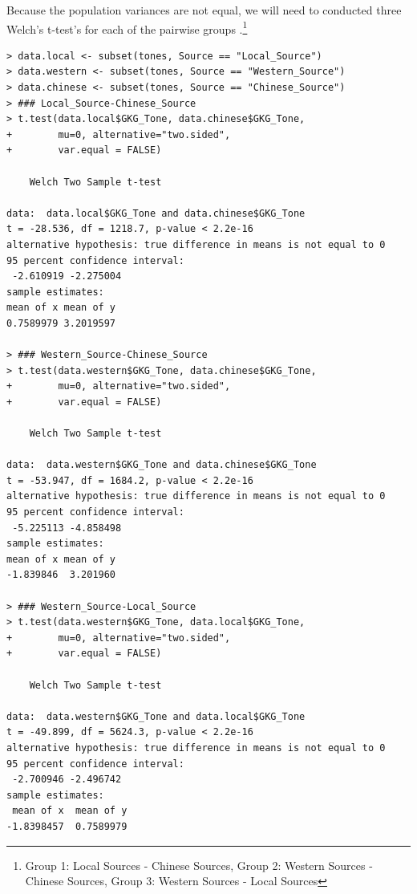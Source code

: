 \documentclass[12pt]{article}
\begin{document}
Because the population variances are not equal, we will need to conducted three Welch's t-test's for each of the pairwise groups .\renewcommand{\thefootnote}{\roman{footnote}}\footnote{Group 1: Local Sources - Chinese Sources, Group 2: Western Sources - Chinese Sources, Group 3: Western Sources - Local Sources} 

\begin{lstlisting}[Language=R,
                    frame=single,
                    basicstyle=\small\ttfamily,
                    stringstyle=\color{DarkGreen},
                    otherkeywords={0,1,2,3,4,5,6,7,8,9},
                    morekeywords={TRUE,FALSE},
                    deletekeywords={data,frame,length,as,character},
                    keywordstyle=\color{None},
                    commentstyle=\color{DarkGreen},
                    showspaces=False,
                    showstringspaces=false,
                    caption= Pairwise Comparisons for Tones,
                    label={lst:R_code_2}]
> data.local <- subset(tones, Source == "Local_Source")
> data.western <- subset(tones, Source == "Western_Source")
> data.chinese <- subset(tones, Source == "Chinese_Source")
> ### Local_Source-Chinese_Source
> t.test(data.local$GKG_Tone, data.chinese$GKG_Tone,
+        mu=0, alternative="two.sided", 
+        var.equal = FALSE) 

	Welch Two Sample t-test

data:  data.local$GKG_Tone and data.chinese$GKG_Tone
t = -28.536, df = 1218.7, p-value < 2.2e-16
alternative hypothesis: true difference in means is not equal to 0
95 percent confidence interval:
 -2.610919 -2.275004
sample estimates:
mean of x mean of y 
0.7589979 3.2019597 

> ### Western_Source-Chinese_Source
> t.test(data.western$GKG_Tone, data.chinese$GKG_Tone,
+        mu=0, alternative="two.sided", 
+        var.equal = FALSE) 

	Welch Two Sample t-test

data:  data.western$GKG_Tone and data.chinese$GKG_Tone
t = -53.947, df = 1684.2, p-value < 2.2e-16
alternative hypothesis: true difference in means is not equal to 0
95 percent confidence interval:
 -5.225113 -4.858498
sample estimates:
mean of x mean of y 
-1.839846  3.201960 

> ### Western_Source-Local_Source
> t.test(data.western$GKG_Tone, data.local$GKG_Tone,
+        mu=0, alternative="two.sided", 
+        var.equal = FALSE) 

	Welch Two Sample t-test

data:  data.western$GKG_Tone and data.local$GKG_Tone
t = -49.899, df = 5624.3, p-value < 2.2e-16
alternative hypothesis: true difference in means is not equal to 0
95 percent confidence interval:
 -2.700946 -2.496742
sample estimates:
 mean of x  mean of y 
-1.8398457  0.7589979 
\end{lstlisting}
\end{document}
